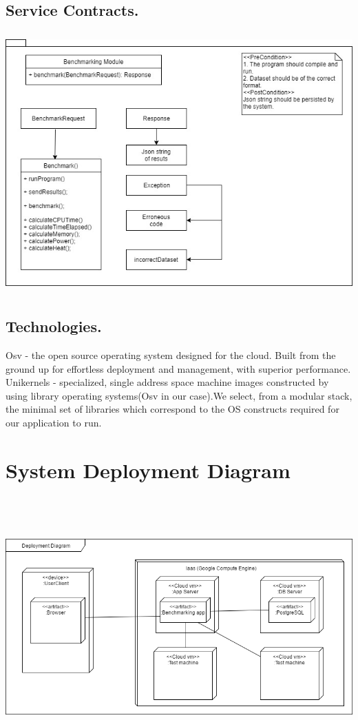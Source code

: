 \documentclass[runningheads,a4paper]{article}
\begin{document}
\subsection{Service Contracts.}
\includegraphics[width=15cm , height=10cm]{../Images/SCBenchmark.jpg}  \\
\subsection{Technologies.}
Osv - the open source operating system designed for the cloud. Built from the ground up for effortless deployment and management, with superior performance.\\

Unikernels - specialized, single address space machine images constructed by using library operating systems(Osv in our case).We select, from a modular stack, the minimal set of libraries which correspond to the OS constructs required for our application to run.\\

\section{System Deployment Diagram}
\includegraphics[width=15cm , height=10cm]{../Images/Deployment.png} \\
\end{document}
